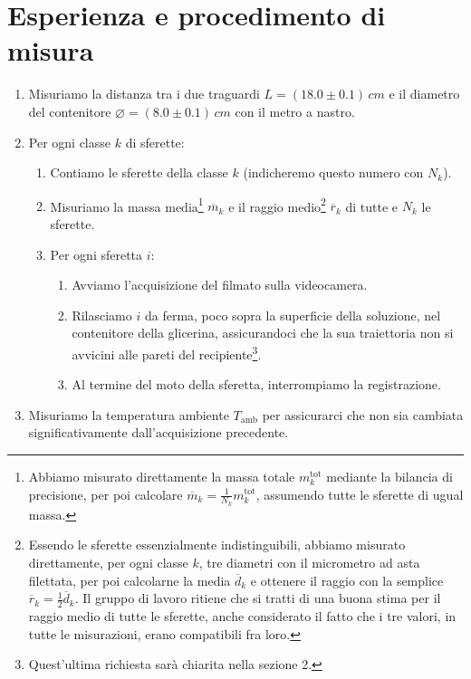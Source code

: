 \documentclass{article}
\newcommand*{\diam}{\varnothing}
\begin{document}
\pagebreak
\section{Esperienza e procedimento di misura}

\begin{enumerate}
  \item Misuriamo la distanza tra i due traguardi $L = (18.0\pm0.1)\,\unit{cm}$
    e il diametro del contenitore $\diam = (8.0\pm0.1)\,\unit{cm}$
    con il metro a nastro.
  \item Per ogni classe $k$ di sferette:
  \begin{enumerate}
    \item
      Contiamo le sferette della classe $k$ (indicheremo questo numero
      con $N_k$).
    \item
      Misuriamo la massa media\footnote{
        Abbiamo misurato direttamente la massa totale $m_k^\text{tot}$
        mediante la bilancia di precisione, per poi calcolare
        $\overline{m}_k = \frac{1}{N_k} m_k^\text{tot}$,
        assumendo tutte le sferette di ugual massa.
      } $\overline{m}_k$ e il raggio medio\footnote{
        Essendo le sferette essenzialmente indistinguibili, abbiamo
        misurato direttamente, per ogni classe $k$, tre diametri con
        il micrometro ad asta filettata, per poi calcolarne la media
        $\overline{d}_k$ e ottenere il raggio con la semplice
        $\overline{r}_k = \frac{1}{2} \overline{d}_k$.
        Il gruppo di lavoro ritiene che si tratti di una buona stima
        per il raggio medio di tutte le sferette, anche considerato
        il fatto che i tre valori, in tutte le misurazioni, erano
        compatibili fra loro.
      } $\overline{r}_k$ di tutte e $N_k$ le sferette.
    \item Per ogni sferetta $i$:
    \begin{enumerate}
      \item
        Avviamo l'acquisizione del filmato sulla videocamera.
      \item
        Rilasciamo $i$ da ferma, poco sopra la superficie della soluzione,
        nel contenitore della glicerina, assicurandoci che la sua traiettoria
        non si avvicini alle pareti del recipiente\footnote{
          Quest'ultima richiesta sarà chiarita nella sezione 2.
        }.
      \item
        Al termine del moto della sferetta, interrompiamo la registrazione.
    \end{enumerate}
  \end{enumerate}
  \item Misuriamo la temperatura ambiente $T_\text{amb}$ per assicurarci
    che non sia cambiata significativamente dall'acquisizione precedente.
\end{enumerate}
\end{document}
